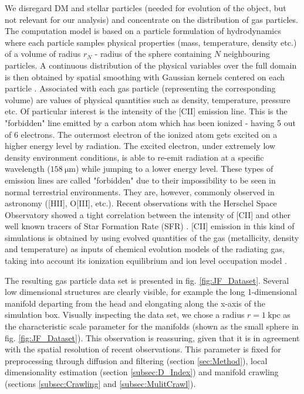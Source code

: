 We disregard DM and stellar particles (needed for evolution of the object, but not relevant for our analysis) and concentrate on the distribution of gas particles. The computation model is based on a particle formulation of hydrodynamics where each particle samples physical properties (mass, temperature, density etc.) of a volume of radius $r_N$ - radius of the sphere containing $N$ neighbouring particles. A continuous distribution of the physical variables over the full domain is then obtained by spatial smoothing with Gaussian kernels centered on each particle \cite{1977MNRAS.181..375G}. Associated with each gas particle (representing the corresponding volume) are values of  physical quantities such as density, temperature, pressure etc. Of particular interest is the intensity of the [CII] emission line. This is the "forbidden" line emitted by a carbon atom which has been ionized - having 5 out of 6 electrons. The outermost electron of the ionized atom gets excited on a higher energy level by radiation. The excited electron, under extremely low density environment conditions, is able to re-emit radiation at a specific wavelength ($158 ~ \mathrm{\mu m}$) while jumping to a lower energy level. These types of emission lines are called "forbidden" due to their impossibility to be seen in normal terrestrial environments.
They are, however, commonly observed in astronomy ([HII], O[III], etc.). Recent observations with the Herschel Space Observatory showed a tight correlation between the intensity of [CII] and other well known tracers of Star Formation Rate (SFR) \cite{DeLooze2011,Herrera_Camus_2015}. [CII] emission in this kind of simulations is obtained by using evolved quantities of the gas (metallicity, density and temperature) as inputs of chemical evolution models of the radiating gas, taking into account its ionization equilibrium and ion level occupation model \cite{Maio2007, DeRijcke2013}.

The resulting gas particle data set is presented in fig. \ref{fig:JF_Dataset}. Several low dimensional structures are clearly visible, for example the long 1-dimensional manifold departing from the head and elongating along the x-axis of the simulation box. Visually inspecting the data set, we chose a radius $r = 1 ~ \mathrm{kpc}$ as the characteristic scale parameter for the manifolds (shown as the small sphere in fig. \ref{fig:JF_Dataset}). This observation is reassuring, given that it is in agreement with the spatial resolution of recent observations. This parameter is fixed for preprocessing through diffusion and filtering (section \ref{sec:Method}), local dimensionality estimation (section \ref{subsec:D_Index}) and manifold crawling (sections \ref{subsec:Crawling} and \ref{subsec:MulitCrawl}).

